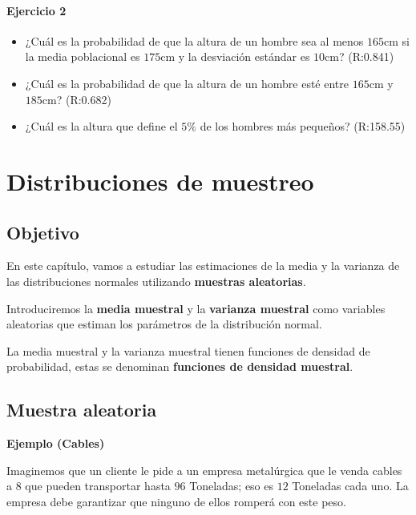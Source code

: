 \documentclass[
]{book}
\begin{document}
\hypertarget{ejercicio-2-6}{%
\subsubsection{Ejercicio 2}\label{ejercicio-2-6}}

\begin{itemize}
\item
  ¿Cuál es la probabilidad de que la altura de un hombre sea al menos
  \(165\)cm si la media poblacional es \(175\)cm y la desviación estándar es \(10\)cm? (R:0.841)
\item
  ¿Cuál es la probabilidad de que la altura de un hombre esté entre
  \(165\)cm y \(185\)cm? (R:0.682)
\item
  ¿Cuál es la altura que define el \(5\%\) de los hombres más pequeños? (R:158.55)
\end{itemize}

\hypertarget{distribuciones-de-muestreo}{%
\chapter{Distribuciones de muestreo}\label{distribuciones-de-muestreo}}

\hypertarget{objetivo-6}{%
\section{Objetivo}\label{objetivo-6}}

En este capítulo, vamos a estudiar las estimaciones de la media y la varianza de las distribuciones normales utilizando \textbf{muestras aleatorias}.

Introduciremos la \textbf{media muestral} y la \textbf{varianza muestral} como variables aleatorias que estiman los parámetros de la distribución normal.

La media muestral y la varianza muestral tienen funciones de densidad de probabilidad, estas se denominan \textbf{funciones de densidad muestral}.

\hypertarget{muestra-aleatoria}{%
\section{Muestra aleatoria}\label{muestra-aleatoria}}

\textbf{Ejemplo (Cables)}

Imaginemos que un cliente le pide a un empresa metalúrgica que le venda cables a \(8\) que pueden transportar hasta \(96\) Toneladas; eso es \(12\) Toneladas cada uno. La empresa debe garantizar que ninguno de ellos romperá con este peso.
\end{document}
